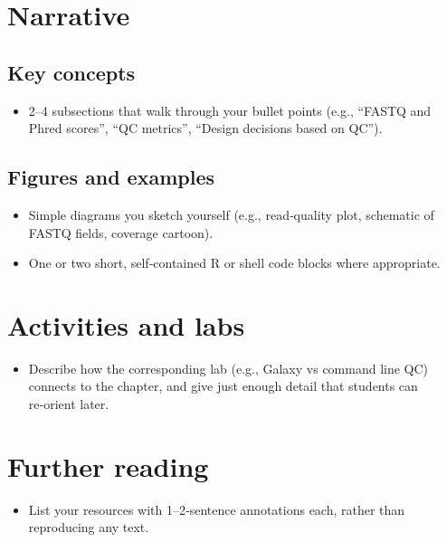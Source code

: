 \documentclass[
  letterpaper,
  DIV=11,
  numbers=noendperiod]{scrreprt}
\providecommand{\tightlist}{%
  \setlength{\itemsep}{0pt}\setlength{\parskip}{0pt}}
\begin{document}
\section{Narrative}\label{narrative}

\subsection{Key concepts}\label{key-concepts}

\begin{itemize}
\tightlist
\item
  2--4 subsections that walk through your bullet points (e.g., ``FASTQ
  and Phred scores'', ``QC metrics'', ``Design decisions based on QC'').
\end{itemize}

\subsection{Figures and examples}\label{figures-and-examples}

\begin{itemize}
\tightlist
\item
  Simple diagrams you sketch yourself (e.g., read‑quality plot,
  schematic of FASTQ fields, coverage cartoon).
\item
  One or two short, self‑contained R or shell code blocks where
  appropriate.
\end{itemize}

\section{Activities and labs}\label{activities-and-labs}

\begin{itemize}
\tightlist
\item
  Describe how the corresponding lab (e.g., Galaxy vs command line QC)
  connects to the chapter, and give just enough detail that students can
  re‑orient later.
\end{itemize}

\section{Further reading}\label{further-reading}

\begin{itemize}
\tightlist
\item
  List your resources with 1--2‑sentence annotations each, rather than
  reproducing any text.
\end{itemize}
\end{document}
